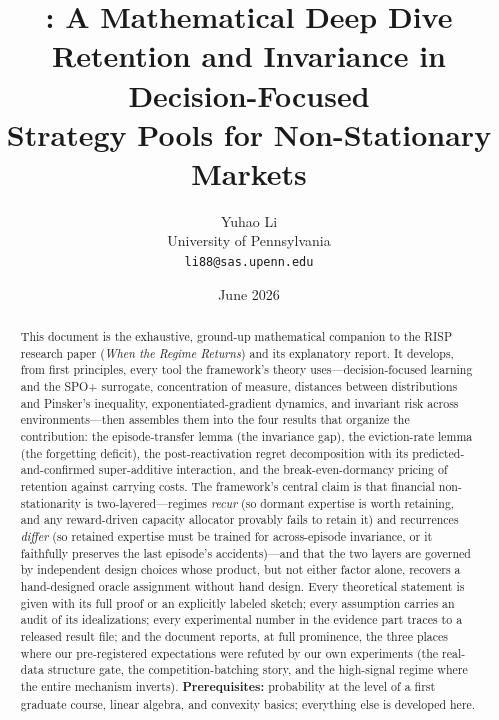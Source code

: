 \documentclass[11pt,a4paper]{article}
\title{\Huge\textbf{\nm{}: A Mathematical Deep Dive}\\[0.5cm]
\Large Retention and Invariance in Decision-Focused\\
Strategy Pools for Non-Stationary Markets}
\author{Yuhao Li\\
University of Pennsylvania\\
\texttt{li88@sas.upenn.edu}}
\date{June 2026}
\theoremstyle{definition}
\theoremstyle{plain}
\newcommand{\nm}{\textsc{RISP}}
\begin{document}
\maketitle

\begin{abstract}
This document is the exhaustive, ground-up mathematical companion to the
\nm{} research paper (\emph{When the Regime Returns}) and its explanatory
report. It develops, from first principles, every tool the framework's
theory uses---decision-focused learning and the SPO+ surrogate,
concentration of measure, distances between distributions and Pinsker's
inequality, exponentiated-gradient dynamics, and invariant risk across
environments---then assembles them into the four results that organize the
contribution: the episode-transfer lemma (the invariance gap), the
eviction-rate lemma (the forgetting deficit), the post-reactivation regret
decomposition with its predicted-and-confirmed super-additive interaction,
and the break-even-dormancy pricing of retention against carrying costs.
The framework's central claim is that financial non-stationarity is
two-layered---regimes \emph{recur} (so dormant expertise is worth
retaining, and any reward-driven capacity allocator provably fails to
retain it) and recurrences \emph{differ} (so retained expertise must be
trained for across-episode invariance, or it faithfully preserves the last
episode's accidents)---and that the two layers are governed by independent
design choices whose product, but not either factor alone, recovers a
hand-designed oracle assignment without hand design. Every theoretical
statement is given with its full proof or an explicitly labeled sketch;
every assumption carries an audit of its idealizations; every experimental
number in the evidence part traces to a released result file; and the
document reports, at full prominence, the three places where our
pre-registered expectations were refuted by our own experiments (the
real-data structure gate, the competition-batching story, and the
high-signal regime where the entire mechanism inverts). \textbf{Prerequisites:}
probability at the level of a first graduate course, linear algebra, and
convexity basics; everything else is developed here.
\end{abstract}

\tableofcontents
\newpage

\end{document}
